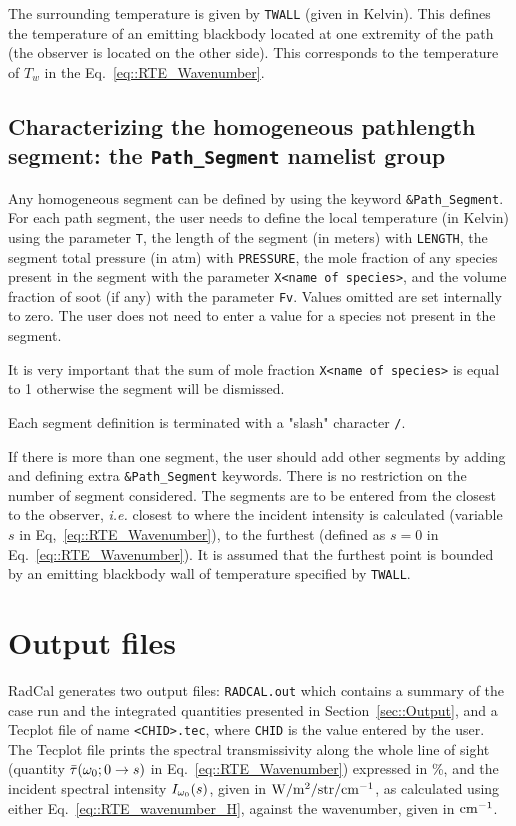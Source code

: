 The surrounding temperature is given by \verb=TWALL= (given in Kelvin). This defines the temperature of an emitting blackbody located at one extremity of the path (the observer is located on the other side). This corresponds to the temperature of $T_{w}$ in the Eq.~\ref{eq::RTE_Wavenumber}.

\subsection{Characterizing the homogeneous pathlength segment: the \texorpdfstring{{\tt Path\_Segment}}{Path_Segment} namelist group}

Any homogeneous segment can be defined by using the keyword \verb=&Path_Segment=. For each path segment, the user needs to define the local temperature (in Kelvin) using the parameter \verb=T=, the length of the segment (in meters) with \verb=LENGTH=, the segment total pressure (in atm) with \verb=PRESSURE=, the mole fraction of any species present in the segment with the parameter \verb=X<name of species>=, and the volume fraction of soot (if any) with the parameter \verb=Fv=. Values omitted are set internally to zero. The user does not need to enter a value for a species not present in the segment.

It is very important that the sum of mole fraction \verb=X<name of species>= is equal to 1 otherwise the segment will be dismissed.

Each segment definition is terminated with a "slash" character \verb=/=.

If there is more than one segment, the user should add other segments by adding and defining extra \verb=&Path_Segment= keywords. There is no restriction on the number of segment considered. The segments are to be entered from the closest to the observer, \textit{i.e.} closest to where the incident intensity is calculated (variable $s$ in Eq,~\ref{eq::RTE_Wavenumber}), to the furthest (defined as $s = 0$ in Eq.~\ref{eq::RTE_Wavenumber}). It is assumed that the furthest point is bounded by an emitting blackbody wall of temperature specified by \verb=TWALL=.

\section{Output files}

RadCal generates two output files: \verb=RADCAL.out= which contains a summary of the case run and the integrated quantities presented in Section~\ref{sec::Output}, and a Tecplot file of name \verb=<CHID>.tec=, where \verb=CHID= is the value entered by the user. The Tecplot file prints the spectral transmissivity along the whole line of sight (quantity $\bar{\tau}(\omega_0; 0 \rightarrow s) $ in Eq.~\ref{eq::RTE_Wavenumber}) expressed in \%, and the incident spectral intensity $I_{\omega_0}(s)$, given in $\rm W/m^{2}/str/cm^{-1}$, as calculated using either Eq.~\ref{eq::RTE_wavenumber_H}, against the wavenumber, given in $\rm cm^{-1}$.

